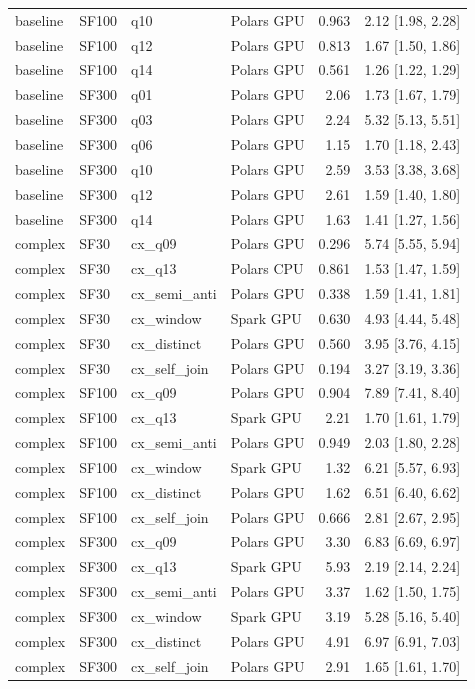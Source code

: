 \begin{longtable}{llllrr}
baseline & SF100 & q10 & Polars GPU & 0.963 & 2.12 [1.98, 2.28] \\
baseline & SF100 & q12 & Polars GPU & 0.813 & 1.67 [1.50, 1.86] \\
baseline & SF100 & q14 & Polars GPU & 0.561 & 1.26 [1.22, 1.29] \\
baseline & SF300 & q01 & Polars GPU & 2.06 & 1.73 [1.67, 1.79] \\
baseline & SF300 & q03 & Polars GPU & 2.24 & 5.32 [5.13, 5.51] \\
baseline & SF300 & q06 & Polars GPU & 1.15 & 1.70 [1.18, 2.43] \\
baseline & SF300 & q10 & Polars GPU & 2.59 & 3.53 [3.38, 3.68] \\
baseline & SF300 & q12 & Polars GPU & 2.61 & 1.59 [1.40, 1.80] \\
baseline & SF300 & q14 & Polars GPU & 1.63 & 1.41 [1.27, 1.56] \\
complex & SF30 & cx\_q09 & Polars GPU & 0.296 & 5.74 [5.55, 5.94] \\
complex & SF30 & cx\_q13 & Polars CPU & 0.861 & 1.53 [1.47, 1.59] \\
complex & SF30 & cx\_semi\_anti & Polars GPU & 0.338 & 1.59 [1.41, 1.81] \\
complex & SF30 & cx\_window & Spark GPU & 0.630 & 4.93 [4.44, 5.48] \\
complex & SF30 & cx\_distinct & Polars GPU & 0.560 & 3.95 [3.76, 4.15] \\
complex & SF30 & cx\_self\_join & Polars GPU & 0.194 & 3.27 [3.19, 3.36] \\
complex & SF100 & cx\_q09 & Polars GPU & 0.904 & 7.89 [7.41, 8.40] \\
complex & SF100 & cx\_q13 & Spark GPU & 2.21 & 1.70 [1.61, 1.79] \\
complex & SF100 & cx\_semi\_anti & Polars GPU & 0.949 & 2.03 [1.80, 2.28] \\
complex & SF100 & cx\_window & Spark GPU & 1.32 & 6.21 [5.57, 6.93] \\
complex & SF100 & cx\_distinct & Polars GPU & 1.62 & 6.51 [6.40, 6.62] \\
complex & SF100 & cx\_self\_join & Polars GPU & 0.666 & 2.81 [2.67, 2.95] \\
complex & SF300 & cx\_q09 & Polars GPU & 3.30 & 6.83 [6.69, 6.97] \\
complex & SF300 & cx\_q13 & Spark GPU & 5.93 & 2.19 [2.14, 2.24] \\
complex & SF300 & cx\_semi\_anti & Polars GPU & 3.37 & 1.62 [1.50, 1.75] \\
complex & SF300 & cx\_window & Spark GPU & 3.19 & 5.28 [5.16, 5.40] \\
complex & SF300 & cx\_distinct & Polars GPU & 4.91 & 6.97 [6.91, 7.03] \\
complex & SF300 & cx\_self\_join & Polars GPU & 2.91 & 1.65 [1.61, 1.70] \\
\end{longtable}
